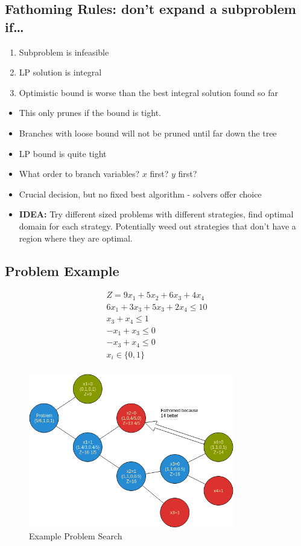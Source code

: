\documentclass[12pt, letter]{article}
\begin{document}
\subsection*{Fathoming Rules: don't expand a subproblem if\ldots}
\begin{enumerate}
	\item Subproblem is infeasible
	\item LP solution is integral
	\item Optimistic bound is worse than the best integral solution found so far
\end{enumerate}

\begin{itemize}
	\item This only prunes if the bound is tight.
	\item Branches with loose bound will not be pruned until far down the tree
	\item LP bound is quite tight
	\item What order to branch variables? $x$ first? $y$ first?
	\item Crucial decision, but no fixed best algorithm - solvers offer choice
	\item \textbf{IDEA:} Try different sized problems with different strategies, find optimal domain for each strategy. Potentially weed out strategies that don't have a region where they are optimal. 
\end{itemize}

\subsection*{Problem Example}
\begin{gather*}
Z = 9x_1+5x_2+6x_3+4x_4 \\
6x_1+3x_3+5x_3+2x_4 \le  10 \\
x_3+x_4 \le 1 \\
-x_1+x_3 \le 0 \\
-x_3+x_4 \le 0 \\
x_i \in \{0, 1\} \\
\end{gather*}

\begin{figure}[h]
	\centering
	\includegraphics[width=0.8\textwidth]{ex1}
	\caption{Example Problem Search}
	\label{fig:ex1}
\end{figure}
\end{document}
